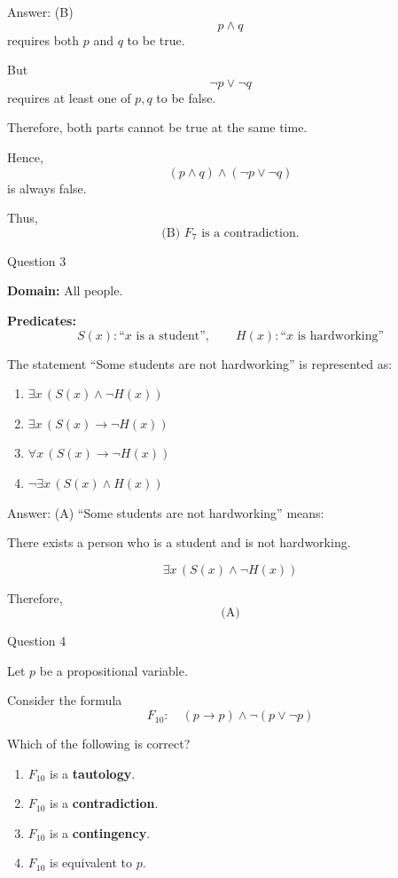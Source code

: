 \documentclass[aspectratio=169,11pt]{beamer}
\begin{document}
\begin{frame}

\begin{block}{Answer: (B)}
$$
p\land q
$$
requires both $p$ and $q$ to be true.

But
$$
\neg p\lor\neg q
$$
requires at least one of $p,q$ to be false.

Therefore, both parts cannot be true at the same time.

Hence,
$$
(p\land q)\land(\neg p\lor\neg q)
$$
is always false.

Thus,
$$
\boxed{\text{(B) }F_7\text{ is a contradiction.}}
$$
\end{block}

\end{frame}
\begin{frame}{Question 3}

\textbf{Domain:} All people.

\textbf{Predicates:}
$$
S(x):\text{``$x$ is a student''},\qquad
H(x):\text{``$x$ is hardworking''}
$$

The statement ``Some students are not hardworking'' is represented as:

\begin{enumerate}
    \item[(A)] $\exists x\,(S(x)\land\neg H(x))$
    \item[(B)] $\exists x\,(S(x)\to\neg H(x))$
    \item[(C)] $\forall x\,(S(x)\to\neg H(x))$
    \item[(D)] $\neg\exists x\,(S(x)\land H(x))$
\end{enumerate}

\end{frame}

\begin{frame}

\begin{block}{Answer: (A)}
``Some students are not hardworking'' means:

There exists a person who is a student and is not hardworking.

$$
\exists x\,(S(x)\land\neg H(x))
$$

Therefore,
$$
\boxed{\text{(A)}}
$$
\end{block}

\end{frame}
\begin{frame}{Question 4}

Let $p$ be a propositional variable.

Consider the formula
$$
F_{10}:\quad (p\to p)\land\neg(p\lor\neg p)
$$

Which of the following is correct?

\begin{enumerate}
    \item[(A)] $F_{10}$ is a \textbf{tautology}.
    \item[(B)] $F_{10}$ is a \textbf{contradiction}.
    \item[(C)] $F_{10}$ is a \textbf{contingency}.
    \item[(D)] $F_{10}$ is equivalent to $p$.
\end{enumerate}

\end{frame}
\end{document}
